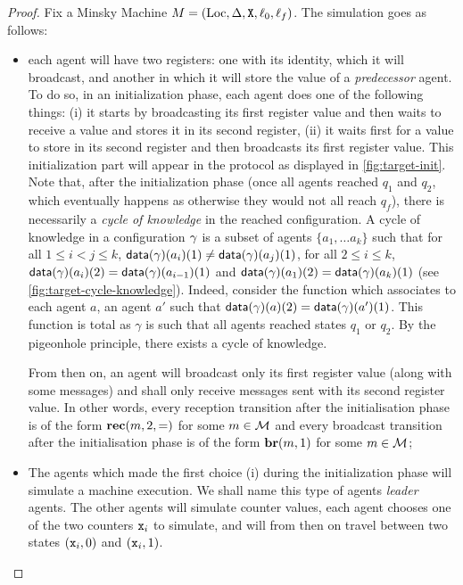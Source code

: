 \begin{proof}
	
	
	
	Fix a Minsky Machine $M= (\text{Loc}, \Delta, \mathtt{X}, \ell_0, \ell_f)$. The simulation goes as follows: 
	\begin{itemize}
		\item each agent will have two registers: one with its identity, which it will broadcast, and another in which it will store the value of a \emph{predecessor} agent. To do so, in an initialization phase, each agent does one of the following things: (i) it starts by broadcasting its first register value and then waits to receive a value and stores it in its second register, (ii) it waits first for a value to store in its second register and then broadcasts its first register value. This initialization part will appear in the protocol as displayed in \cref{fig:target-init}. Note that, after the initialization phase (once all agents reached $q_1$ and $q_2$, which eventually happens as otherwise they would not all reach $q_f$), there is necessarily a \emph{cycle of knowledge} in the reached configuration. A cycle of knowledge in a configuration $\gamma$ is a subset of agents $\{a_1, \dots a_k\}$ such that for all $1 \leq i < j \leq k$, $\mathsf{data}(\gamma)(a_i)(1) \ne \mathsf{data}(\gamma)(a_j)(1)$, for all $2 \leq i \leq k$, $\mathsf{data}(\gamma)(a_i)(2) = \mathsf{data}(\gamma)(a_{i-1})(1)$ and $\mathsf{data}(\gamma)(a_1)(2) = \mathsf{data}(\gamma)(a_{k})(1)$ (see \cref{fig:target-cycle-knowledge}). Indeed, consider the function which associates to each agent $a$, an agent $a'$ such that $\mathsf{data}(\gamma)(a)(2) = \mathsf{data}(\gamma)(a')(1)$. This function is total as $\gamma$ is such that all agents reached states $q_1$ or $q_2$. By the pigeonhole principle, there exists a cycle of knowledge.
		
		From then on, an agent will broadcast only its first register value (along with some messages) and shall only receive messages sent with its second register value. In other words, every reception transition after the initialisation phase is of the form $\textbf{rec}(m, 2, =)$ for some $m \in \mathcal{M}$ and every broadcast transition after the initialisation  phase is of the form $\textbf{br}(m, 1)$ for some $m \in \mathcal{M}$;
		
		\item The agents which made the first choice (i) during the initialization phase will simulate a machine execution. We shall name this type of agents \emph{leader} agents.  
		The other agents will simulate counter values, each agent chooses one of the two counters $\mathtt{x}_i$ to simulate, and will from then on travel between two states $(\mathtt{x}_i, 0)$ and $(\mathtt{x}_i, 1)$.
		

\end{itemize}
\end{proof}
